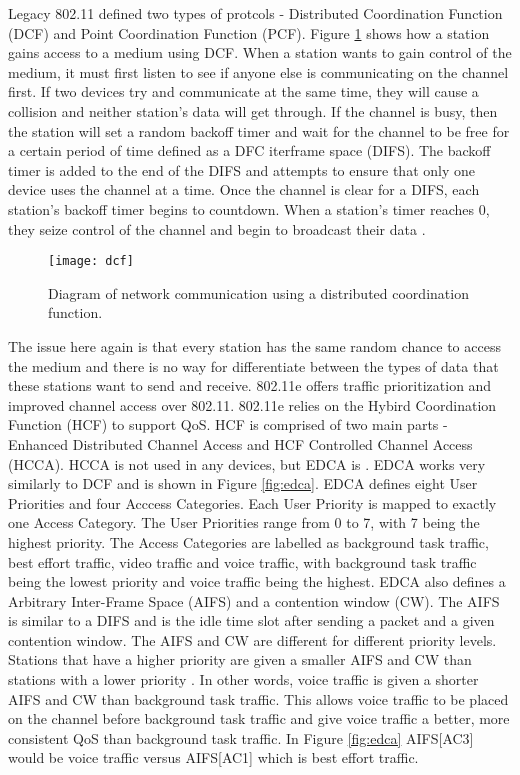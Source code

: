\documentclass[12pt]{article}
\begin{document}
Legacy 802.11 defined two types of protcols - Distributed Coordination Function (DCF) and Point Coordination Function (PCF).  Figure \ref{fig:dcf} shows how a station gains access to a medium using DCF.  When a station wants to gain control of the medium, it must first listen to see if anyone else is communicating on the channel first.  If two devices try and communicate at the same time, they will cause a collision and neither station's data will get through. If the channel is busy, then the station will set a random backoff timer and wait for the channel to be free for a certain period of time defined as a DFC iterframe space (DIFS).  The backoff timer is added to the end of the DIFS and attempts to ensure that only one device uses the channel at a time.  Once the channel is clear for a DIFS, each station's backoff timer begins to countdown.  When a station's timer reaches 0, they seize control of the channel and begin to broadcast their data \cite{Thottan:2006:IEM:1234161.1234187}.

\begin{figure}[h]
  \begin{center}
    \texttt{[image: dcf]}
    \caption{Diagram of network communication using a distributed coordination function.}
    \label{fig:dcf}
  \end{center}
\end{figure}

The issue here again is that every station has the same random chance to access the medium and there is no way for differentiate between the types of data that these stations want to send and receive.  802.11e offers traffic prioritization and improved channel access over 802.11.  802.11e relies on the Hybird Coordination Function (HCF) to support QoS.  HCF is comprised of two main parts - Enhanced Distributed Channel Access and  HCF Controlled
Channel Access (HCCA).  HCCA is not used in any devices, but EDCA is \cite{Thottan:2006:IEM:1234161.1234187}.  EDCA works very similarly to DCF and is shown in Figure \ref{fig:edca}.  EDCA defines eight User Priorities and four Acccess Categories.  Each User Priority is mapped to exactly one Access Category.  The User Priorities range from 0 to 7, with 7 being the highest priority.  The Access Categories are labelled as background task traffic, best effort traffic, video traffic and voice traffic, with background task traffic being the lowest priority and voice traffic being the highest.  EDCA also defines a Arbitrary Inter-Frame Space (AIFS) and a contention window (CW).  The AIFS is similar to a DIFS and is the idle time slot after sending a packet and a given contention window.  The AIFS and CW are different for different priority levels.  Stations that have a higher priority are given a smaller AIFS and CW than stations with a lower priority \cite{7434292}.  In other words, voice traffic is given a shorter AIFS and CW than background task traffic.  This allows voice traffic to be placed on the channel before background task traffic and give voice traffic a better, more consistent QoS than background task traffic.  In Figure \ref{fig:edca} AIFS[AC3] would be voice traffic versus AIFS[AC1] which is best effort traffic.
\end{document}
